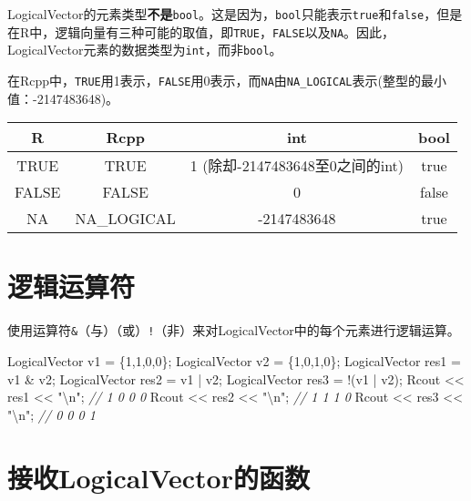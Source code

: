 \documentclass[]{ctexbook}
\newenvironment{Shaded}{\begin{snugshade}}{\end{snugshade}}
\newcommand{\DecValTok}[1]{\textcolor[rgb]{0.00,0.00,0.81}{#1}}
\newcommand{\SpecialCharTok}[1]{\textcolor[rgb]{0.00,0.00,0.00}{#1}}
\newcommand{\StringTok}[1]{\textcolor[rgb]{0.31,0.60,0.02}{#1}}
\newcommand{\CommentTok}[1]{\textcolor[rgb]{0.56,0.35,0.01}{\textit{#1}}}
\newcommand{\NormalTok}[1]{#1}
\begin{document}
LogicalVector的元素类型\textbf{不是}\texttt{bool}。这是因为，\texttt{bool}只能表示\texttt{true}和\texttt{false}，但是在R中，逻辑向量有三种可能的取值，即\texttt{TRUE}，\texttt{FALSE}以及\texttt{NA}。因此，LogicalVector元素的数据类型为\texttt{int}，而非\texttt{bool}。

在Rcpp中，\texttt{TRUE}用1表示，\texttt{FALSE}用0表示，而\texttt{NA}由\texttt{NA\_LOGICAL}表示(整型的最小值：-2147483648)。

\begin{longtable}[]{@{}cccc@{}}
\toprule
R & Rcpp & int & bool\tabularnewline
\midrule
\endhead
TRUE & TRUE & 1 (除却-2147483648至0之间的int) & true\tabularnewline
FALSE & FALSE & 0 & false\tabularnewline
NA & NA\_LOGICAL & -2147483648 & true\tabularnewline
\bottomrule
\end{longtable}

\section{逻辑运算符}\label{Logical-operations-subtitle}

使用运算符\texttt{\&}（与）\texttt{\textbar{}}（或）\texttt{!}（非）来对LogicalVector中的每个元素进行逻辑运算。

\begin{Shaded}
\begin{Highlighting}[]
\NormalTok{LogicalVector v1 = \{}\DecValTok{1}\NormalTok{,}\DecValTok{1}\NormalTok{,}\DecValTok{0}\NormalTok{,}\DecValTok{0}\NormalTok{\};}
\NormalTok{LogicalVector v2 = \{}\DecValTok{1}\NormalTok{,}\DecValTok{0}\NormalTok{,}\DecValTok{1}\NormalTok{,}\DecValTok{0}\NormalTok{\};}
\NormalTok{LogicalVector res1 = v1 & v2;}
\NormalTok{LogicalVector res2 = v1 | v2;}
\NormalTok{LogicalVector res3 = !(v1 | v2);}
\NormalTok{Rcout << res1 << }\StringTok{"}\SpecialCharTok{\textbackslash{}n}\StringTok{"}\NormalTok{; }\CommentTok{// 1 0 0 0}
\NormalTok{Rcout << res2 << }\StringTok{"}\SpecialCharTok{\textbackslash{}n}\StringTok{"}\NormalTok{; }\CommentTok{// 1 1 1 0}
\NormalTok{Rcout << res3 << }\StringTok{"}\SpecialCharTok{\textbackslash{}n}\StringTok{"}\NormalTok{; }\CommentTok{// 0 0 0 1}
\end{Highlighting}
\end{Shaded}

\section{接收LogicalVector的函数}\label{Function-that-receives-LogicalVector}
\end{document}
